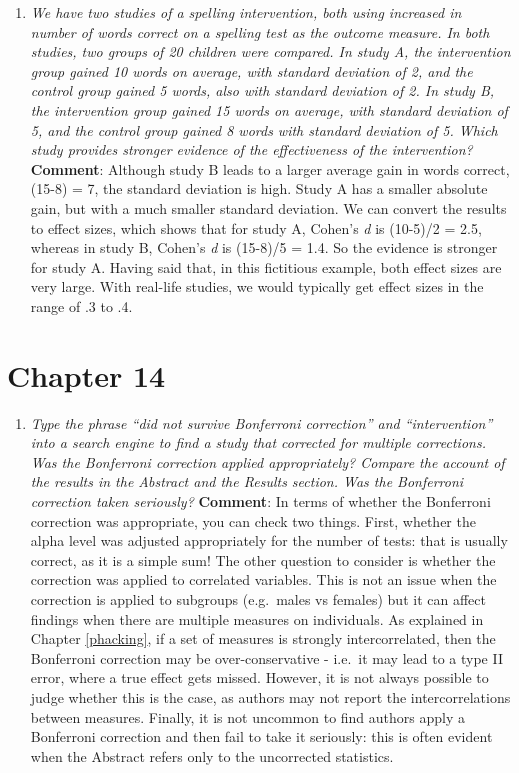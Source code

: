\documentclass{krantz}
\providecommand{\tightlist}{%
\setlength{\itemsep}{0pt}\setlength{\parskip}{0pt}}
\begin{document}
\begin{enumerate}
\def\labelenumi{\arabic{enumi}.}
\tightlist
\item
  \emph{We have two studies of a spelling intervention, both using increased in number of words correct on a spelling test as the outcome measure. In both studies, two groups of 20 children were compared. In study A, the intervention group gained 10 words on average, with standard deviation of 2, and the control group gained 5 words, also with standard deviation of 2. In study B, the intervention group gained 15 words on average, with standard deviation of 5, and the control group gained 8 words with standard deviation of 5. Which study provides stronger evidence of the effectiveness of the intervention?}\\
  \textbf{Comment}: Although study B leads to a larger average gain in words correct, (15-8) = 7, the standard deviation is high. Study A has a smaller absolute gain, but with a much smaller standard deviation. We can convert the results to effect sizes, which shows that for study A, Cohen's \emph{d} is (10-5)/2 = 2.5, whereas in study B, Cohen's \emph{d} is (15-8)/5 = 1.4. So the evidence is stronger for study A. Having said that, in this fictitious example, both effect sizes are very large. With real-life studies, we would typically get effect sizes in the range of .3 to .4.
\end{enumerate}

\hypertarget{chapter-14}{%
\section{Chapter 14}\label{chapter-14}}

\begin{enumerate}
\def\labelenumi{\arabic{enumi}.}
\tightlist
\item
  \emph{Type the phrase ``did not survive Bonferroni correction'' and ``intervention'' into a search engine to find a study that corrected for multiple corrections. Was the Bonferroni correction applied appropriately? Compare the account of the results in the Abstract and the Results section. Was the Bonferroni correction taken seriously?}
  \textbf{Comment}: In terms of whether the Bonferroni correction was appropriate, you can check two things. First, whether the alpha level was adjusted appropriately for the number of tests: that is usually correct, as it is a simple sum! The other question to consider is whether the correction was applied to correlated variables. This is not an issue when the correction is applied to subgroups (e.g.~males vs females) but it can affect findings when there are multiple measures on individuals. As explained in Chapter \ref{phacking}, if a set of measures is strongly intercorrelated, then the Bonferroni correction may be over-conservative - i.e.~it may lead to a type II error, where a true effect gets missed. However, it is not always possible to judge whether this is the case, as authors may not report the intercorrelations between measures. Finally, it is not uncommon to find authors apply a Bonferroni correction and then fail to take it seriously: this is often evident when the Abstract refers only to the uncorrected statistics.
\end{enumerate}
\end{document}
